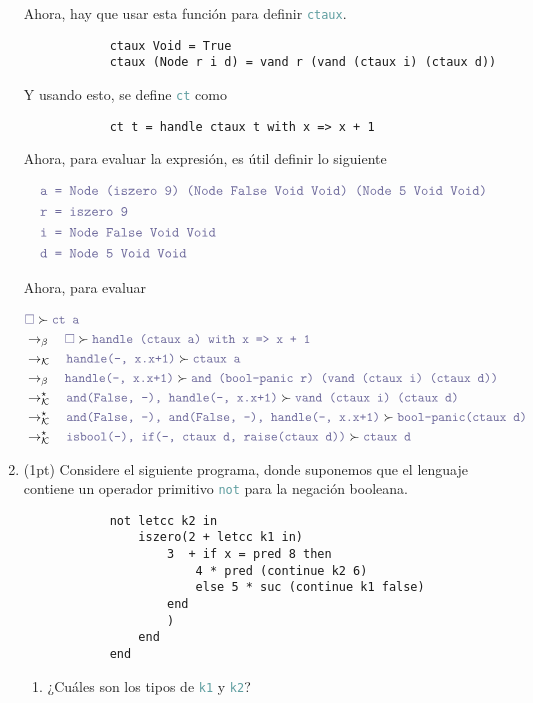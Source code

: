 \documentclass{article}
\newcommand{\tx}[1]{\textcolor{CadetBlue} {\texttt{#1}}}
\newcommand{\pt}[1]{\textcolor{RoyalPurple}{(#1pt)}}
\newcommand{\es}{$\square$}
\newcommand{\pop}[2]{ \tx{#1} \succ \tx{#2}}
\newcommand{\kr}{\rightarrow_{\mathcal{K}} \quad}
\newcommand{\br}{\rightarrow_{\beta} \quad}
\newcommand{\krs}{\rightarrow_{\mathcal{K}}^{\star} \quad}
\begin{document}
\begin{enumerate}
        Ahora, hay que usar esta función para definir \tx{ctaux}.

        \begin{verbatim}
            ctaux Void = True
            ctaux (Node r i d) = vand r (vand (ctaux i) (ctaux d))
        \end{verbatim}

        Y usando esto, se define \tx{ct} como 

        \begin{verbatim}
            ct t = handle ctaux t with x => x + 1
        \end{verbatim}

        Ahora, para evaluar la expresión, es útil definir lo siguiente

            
        \begin{align*}
            &\tx{a = Node (iszero 9) (Node False Void Void) (Node 5 Void Void)} \\
            &\tx{r = iszero 9}\\
            &\tx{i = Node False Void Void}\\
            &\tx{d = Node 5 Void Void}
        \end{align*}

        Ahora, para evaluar

        \begin{align*}
            &\pop{\es}{ct a} \\
            &\br \pop{\es}{handle (ctaux a) with x => x + 1}\\
            &\kr \pop{handle(-, x.x+1)}{ctaux a}\\
            &\br \pop{handle(-, x.x+1)}{and (bool-panic r) (vand (ctaux i) (ctaux d))}\\
            &\krs \pop{and(False, -), handle(-, x.x+1)}{vand (ctaux i) (ctaux d)}\\
            &\krs \pop{and(False, -), and(False, -), handle(-, x.x+1)}{bool-panic(ctaux d)}\\
            &\krs \pop{isbool(-), if(-, ctaux d, raise(ctaux d))}{ctaux d}
        \end{align*}

        \item \pt{1} Considere el siguiente programa, donde suponemos que el 
        lenguaje contiene un operador primitivo \tx{not} para la negación 
        booleana.

        \begin{verbatim}
            not letcc k2 in
                iszero(2 + letcc k1 in)
                    3  + if x = pred 8 then 
                        4 * pred (continue k2 6) 
                        else 5 * suc (continue k1 false)
                    end
                    )
                end
            end
        \end{verbatim}
        \begin{enumerate}
            \item ¿Cuáles son los tipos de \tx{k1} y \tx{k2}?


\end{enumerate}
\end{enumerate}
\end{document}
